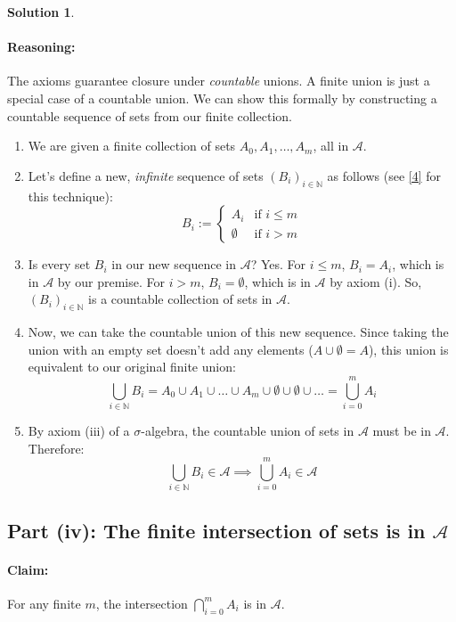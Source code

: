 \documentclass[11pt,a4paper]{article}
\theoremstyle{definition}
\newtheorem*{solution}{Solution}
\begin{document}
\begin{solution}
\paragraph{Reasoning:}
The axioms guarantee closure under \textit{countable} unions. A finite union is just a special case of a countable union. We can show this formally by constructing a countable sequence of sets from our finite collection.
\begin{enumerate}
    \item We are given a finite collection of sets $A_0, A_1, \dots, A_m$, all in $\mathcal{A}$.
    \item Let's define a new, \textit{infinite} sequence of sets $(B_i)_{i \in \mathbb{N}}$ as follows (see \hyperlink{note:padding}{[4]} for this technique):
    \[ B_i := \begin{cases} A_i & \text{if } i \le m \\ \emptyset & \text{if } i > m \end{cases} \]
    \item Is every set $B_i$ in our new sequence in $\mathcal{A}$? Yes. For $i \le m$, $B_i = A_i$, which is in $\mathcal{A}$ by our premise. For $i > m$, $B_i = \emptyset$, which is in $\mathcal{A}$ by axiom (i). So, $(B_i)_{i \in \mathbb{N}}$ is a countable collection of sets in $\mathcal{A}$.
    \item Now, we can take the countable union of this new sequence. Since taking the union with an empty set doesn't add any elements ($A \cup \emptyset = A$), this union is equivalent to our original finite union:
    \[ \bigcup_{i \in \mathbb{N}} B_i = A_0 \cup A_1 \cup \dots \cup A_m \cup \emptyset \cup \emptyset \cup \dots = \bigcup_{i=0}^{m} A_i \]
    \item By axiom (iii) of a $\sigma$-algebra, the countable union of sets in $\mathcal{A}$ must be in $\mathcal{A}$. Therefore:
    \[ \bigcup_{i \in \mathbb{N}} B_i \in \mathcal{A} \implies \bigcup_{i=0}^{m} A_i \in \mathcal{A} \]
\end{enumerate}

\subsection*{Part (iv): The finite intersection of sets is in $\mathcal{A}$}

\paragraph{Claim:} For any finite $m$, the intersection $\bigcap_{i=0}^{m} A_i$ is in $\mathcal{A}$.


\end{solution}
\end{document}
